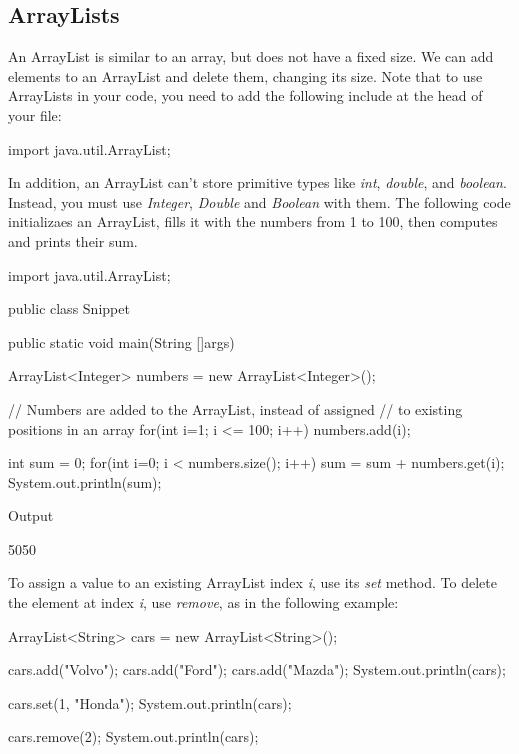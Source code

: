\subsection{ArrayLists}

An ArrayList is similar to an array, but does not have a fixed size. We can add elements to an ArrayList and delete them, changing its size. Note that to use ArrayLists in your code, you need to add the following include at the head of your file:

\begin{code}
import java.util.ArrayList;
\end{code}

In addition, an ArrayList can't store primitive types like \textit{int}, \textit{double}, and \textit{boolean}. Instead, you must use \textit{Integer}, \textit{Double} and \textit{Boolean} with them. The following code initializaes an ArrayList, fills it with the numbers from 1 to 100, then computes and prints their sum.


\begin{code}
import java.util.ArrayList;

public class Snippet{

    public static void main(String []args){
        ArrayList<Integer> numbers = new ArrayList<Integer>();

        // Numbers are added to the ArrayList, instead of assigned
        // to existing positions in an array
        for(int i=1; i <= 100; i++){
            numbers.add(i);
        }
        
        int sum = 0;
        for(int i=0; i < numbers.size(); i++){
            sum = sum + numbers.get(i);
        }
    System.out.println(sum);
    }
}
\end{code}

Output
\begin{code}
5050
\end{code}

To assign a value to an existing ArrayList index \textit{i}, use its \textit{set} method. To delete the element at index \textit{i}, use \textit{remove}, as in the following example:

\begin{code}
ArrayList<String> cars = new ArrayList<String>();

cars.add("Volvo");
cars.add("Ford");
cars.add("Mazda");
System.out.println(cars); 

cars.set(1, "Honda");
System.out.println(cars); 

cars.remove(2);
System.out.println(cars); 
\end{code}

